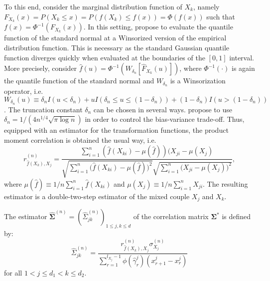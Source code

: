 To this end, consider the marginal distribution function of $X_k$, namely $F_{X_k}(x)=P(X_k \leq x) = P(f(X_k) \leq f(x)) = \Phi(f(x))$ such that $f(x) = \Phi^{-1}(F_{X_k}(x))$. In this setting, \citet{Liu09} propose to evaluate the quantile function of the standard normal at a Winsorized version of the empirical distribution function. This is necessary as the standard Gaussian quantile function diverges quickly when evaluated at the boundaries of the $[0,1]$ interval. More precisely, consider $\hat{f}(u) = \Phi^{-1}(W_{\delta_n}[\hat{F}_{X_k}(u)])$, where $\Phi^{-1}(\cdot)$ is again the quantile function of the standard normal and $W_{\delta_n}$ is a Winsorization operator, i.e. $W_{\delta_n}(u) \equiv \delta_n I(u < \delta_n) + u I(\delta_n \leq u \leq (1-\delta_n)) + (1-\delta_n) I(u > (1-\delta_n))$. The truncation constant $\delta_n$ can be chosen in several ways. 
\citet{Liu09} propose to use $\delta_n = 1/(4n^{1/4}\sqrt{\pi\log n})$ in order to control the bias-variance trade-off. Thus, equipped with an estimator for the transformation functions, the product moment correlation is obtained the usual way, i.e.
\begin{equation*}
    r^{(n)}_{\hat{f}(X_k),X_j} = \frac{\sum_{i=1}^n (\hat{f}(X_{ki}) - \mu(\hat{f}))(X_{ji} - \mu(X_j)}{\sqrt{\sum_{i=1}^n \Big(\hat{f}(X_{ki}) - \mu(\hat{f})\Big)^2}\sqrt{\sum_{i=1}^n \Big(X_{ji} - \mu(X_j)\Big)^2}},
\end{equation*}
where $\mu(\hat{f}) \equiv 1/n\sum_{i=1}^n \hat{f}(X_{ki})$ and $\mu(X_j) \equiv 1/n\sum_{i=1}^n X_{ji}$. The resulting estimator is a double-two-step estimator of the mixed couple $X_j$ and $X_k$.
\begin{definition}
    The estimator $\hat{\boldsymbol{\Sigma}}^{(n)} = (\hat{\Sigma}_{jk}^{(n)})_{1\leq j, k\leq d}$ of the correlation matrix $\boldsymbol{\Sigma}^*$ is defined by:
\begin{equation}
    \hat{\Sigma}_{jk}^{(n)} = \frac{r^{(n)}_{\hat{f}(X_k),X_j} \sigma^{(n)}_{X_j}}{\sum_{r=1}^{l_{X_j}-1} \phi(\hat{\gamma}^j_r)(x^j_{r+1} - x^j_r)}
\end{equation}
    for all $1 < j \leq d_1 < k \leq d_2$. 
\end{definition}



